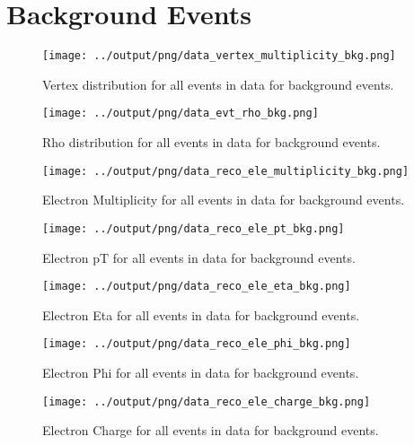 \documentclass[11pt]{book}
\begin{document}
\section{Background Events}
\begin{figure}[htb]
\centering
\texttt{[image: ../output/png/data\_vertex\_multiplicity\_bkg.png]}
\caption{Vertex distribution for all events in data for background events.}
\label{fig:data_vertex_multiplicity_bkg}
\end{figure}

\begin{figure}[htb]
\centering
\texttt{[image: ../output/png/data\_evt\_rho\_bkg.png]}
\caption{Rho distribution for all events in data for background events.}
\label{fig:data_evt_rho_bkg}
\end{figure}

\begin{figure}[htb]
\centering
\texttt{[image: ../output/png/data\_reco\_ele\_multiplicity\_bkg.png]}
\caption{Electron Multiplicity for all events in data for background events.}
\label{fig:data_ele_multiplicity_bkg}
\end{figure}

\begin{figure}[htb]
\centering
\texttt{[image: ../output/png/data\_reco\_ele\_pt\_bkg.png]}
\caption{Electron pT for all events in data for background events.}
\label{fig:data_ele_pt_bkg}
\end{figure}

\begin{figure}[htb]
\centering
\texttt{[image: ../output/png/data\_reco\_ele\_eta\_bkg.png]}
\caption{Electron Eta for all events in data for background events.}
\label{fig:data_ele_eta_bkg}
\end{figure}

\begin{figure}[htb]
\centering
\texttt{[image: ../output/png/data\_reco\_ele\_phi\_bkg.png]}
\caption{Electron Phi for all events in data for background events.}
\label{fig:data_ele_phi_bkg}
\end{figure}

\begin{figure}[htb]
\centering
\texttt{[image: ../output/png/data\_reco\_ele\_charge\_bkg.png]}
\caption{Electron Charge for all events in data for background events.}
\label{fig:data_ele_charge_bkg}
\end{figure}
\end{document}

